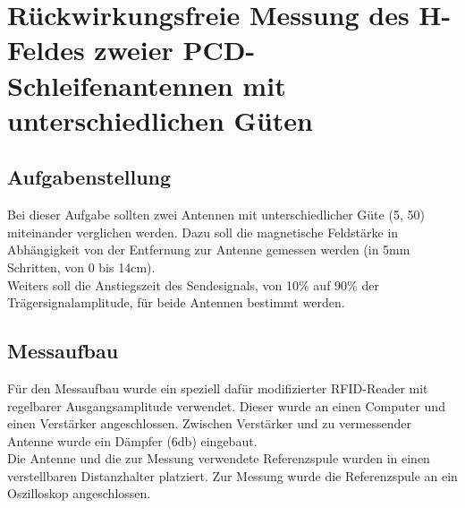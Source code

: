 \documentclass[12pt,a4paper,ngerman]{article}
\begin{document}


%
%

\section{Rückwirkungsfreie Messung des H-Feldes zweier PCD-Schleifenantennen mit unterschiedlichen Güten}
\subsection{Aufgabenstellung}
Bei dieser Aufgabe sollten zwei Antennen mit unterschiedlicher Güte (5, 50) miteinander verglichen werden. Dazu soll die magnetische Feldstärke in Abhängigkeit von der Entfernung zur Antenne gemessen werden (in 5mm Schritten, von 0 bis 14cm).\\
Weiters soll die Anstiegszeit des Sendesignals, von 10\% auf 90\% der Trägersignalamplitude, für beide Antennen bestimmt werden.

\subsection{Messaufbau}
Für den Messaufbau wurde ein speziell dafür modifizierter RFID-Reader mit regelbarer Ausgangsamplitude verwendet. Dieser wurde an einen Computer und einen Verstärker angeschlossen. Zwischen Verstärker und zu vermessender Antenne wurde ein Dämpfer (6db) eingebaut.\\
Die Antenne und die zur Messung verwendete Referenzspule wurden in einen verstellbaren Distanzhalter platziert. Zur Messung wurde die Referenzspule an ein Oszilloskop angeschlossen.
\end{document}
